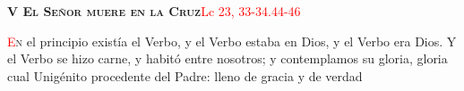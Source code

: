 \noindent\textbf{\textsc{V El Señor muere en la Cruz}}\hfill\textcolor{red}{Lc 23, 33-34.44-46}

\vspace{0.25em}

\lettrine[lines=2]{\textcolor{red}{E}}n el principio existía el Verbo, y el Verbo estaba en Dios, y el Verbo era Dios. Y el Verbo se hizo
carne, y habitó entre nosotros; y contemplamos su gloria, gloria cual Unigénito procedente del Padre: lleno de gracia y de verdad